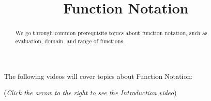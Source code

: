 \documentclass{ximera}
\title[Prerequisite Videos: ]{Function Notation}
\begin{document}
\begin{abstract}
  We go through common prerequisite topics about function notation, such as
  evaluation, domain, and range of functions.
\end{abstract}
\maketitle

The following videos will cover topics about Function Notation:

\begin{center}
\begin{flushright}
{\color{blue}(\emph{Click the arrow to the right to see the Introduction video})}
\end{flushright}
\begin{expandable}

\end{expandable}
\end{center}
\end{document}
